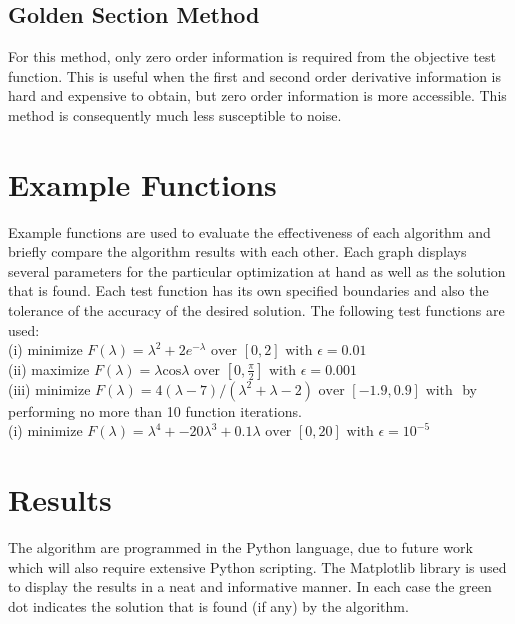 \documentclass[a4paper,10pt]{article}
\begin{document}
\subsection{Golden Section Method}
For this method, only zero order information is required from the objective test function. This is useful when the first and second order derivative information is hard and expensive to obtain, but zero order information is more accessible. This method is consequently much less susceptible to noise.

\section{Example Functions}
Example functions are used to evaluate the effectiveness of each algorithm and briefly compare the algorithm results with each other. Each graph displays several parameters for the particular optimization at hand as well as the solution that is found. Each test function has its own specified boundaries and also the tolerance of the accuracy of the desired solution. The following test functions are used:
\\[0.5cm]
(i) minimize $F(\lambda) = \lambda^{2} + 2e^{-\lambda} \text{ over } [0,2] \text{ with } \epsilon = 0.01$
\\[0.5cm]
(ii) maximize $F(\lambda) = \lambda \text{cos} \lambda \text{ over } [0,\frac{\pi}{2}] \text{ with } \epsilon = 0.001$
\\[0.5cm]
(iii) minimize $F(\lambda) = 4(\lambda - 7) / (\lambda^{2} + \lambda - 2) \text{ over } [-1.9,0.9] \text{ with }$ by performing no more than 10 function iterations.
\\[0.5cm]
(i) minimize $F(\lambda) = \lambda^{4} + -20\lambda^{3} + 0.1\lambda \text{ over } [0,20] \text{ with } \epsilon = 10^{-5}$

\section{Results}
The algorithm are programmed in the Python language, due to future work which will also require extensive Python scripting. The Matplotlib library is used to display the results in a neat and informative manner. In each case the green dot indicates the solution that is found (if any) by the algorithm.

\newpage
\end{document}
